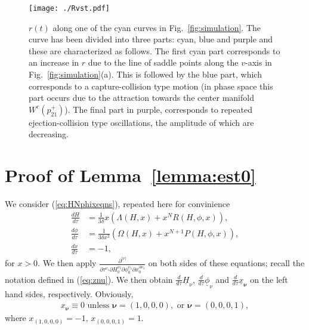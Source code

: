 \documentclass[reqno,12pt]{amsart}
\newcommand{\secref}[1]{Section~\ref{sec:#1}}
\newcommand{\eqlab}[1]{\label{eq:#1}}
\renewcommand{\eqref}[1]{(\ref{eq:#1})}
\newcommand{\figref}[1]{Fig.~\ref{fig:#1}}
\newcommand{\figlab}[1]{\label{fig:#1}}
\newcommand{\lemmaref}[1]{Lemma~\ref{lemma:#1}}
\newcommand{\applab}[1]{\label{app:#1}}
\numberwithin{equation}{section}
\begin{document}
 
 \begin{figure}[h!]
 	\begin{center}
 		{\texttt{[image: ./Rvst.pdf]}}
 		\caption{$r(t)$ along one of the cyan curves in \figref{simulation}. The curve has been divided into three parts: cyan, blue and purple and these are characterized as follows. The first cyan part corresponds to an increase in $r$ due to the line of saddle points along the $v$-axis in \figref{simulation}(a). This is followed by the blue part, which corresponds to a capture-collision type motion (in phase space this part occurs due to the attraction towards the center manifold $W^c(p_{21}^+)$). The final part in purple, corresponds to repeated ejection-collision type oscillations, the amplitude of which are decreasing. }\figlab{Rvst}
 	\end{center}
 \end{figure}


\newpage
\appendix
\section{Proof of \lemmaref{est0}}\applab{est}
We consider \eqref{HNphixeqns}, repeated here for convinience
\begin{equation}\eqlab{HNphixeqns2}
\begin{aligned}
 \frac{dH}{d\tau} &= \frac{1}{3\delta} x\left( \Lambda(H,x)+x^{N} R(H,\phi,x)\right),\\
 \frac{d\phi}{d\tau} & = \frac{1}{3\delta x^2} \left(\Omega(H,x)+x^{N+1} P(H,\phi,x)\right),\\
 \frac{dx}{d\tau}&=-1,
\end{aligned}
\end{equation}
for $x>0$. We then apply $\frac{\partial^{\vert \mathbb \nu\vert}}{\partial \tau^{\nu_1}\partial H_0^{\mathbb \nu_2} \partial \phi_0^{\mathbb \nu_3} \partial x_0^{\partial \nu_4} }$ on both sides of these equations; recall the notation defined in \eqref{znu}. We then obtain $\frac{d}{d\tau}\underline H_{\mathbb \nu}$, $\frac{d}{d\tau}\underline \phi_{\mathbb \nu}$ and $\frac{d}{d\tau}\underline x_{\mathbf \nu}$ on the left hand sides, respectively.  Obviously, 
\begin{align}\eqlab{xnu}
x_{\mathbf \nu} \equiv 0 \, \,\text{unless}\, \, \mathbf \nu=(1,0,0,0),\,\, \text{or}\,\, \mathbf \nu =(0,0,0,1),
\end{align}
where $x_{(1,0,0,0)}=-1,\,x_{(0,0,0,1)}=1$.
\end{document}
